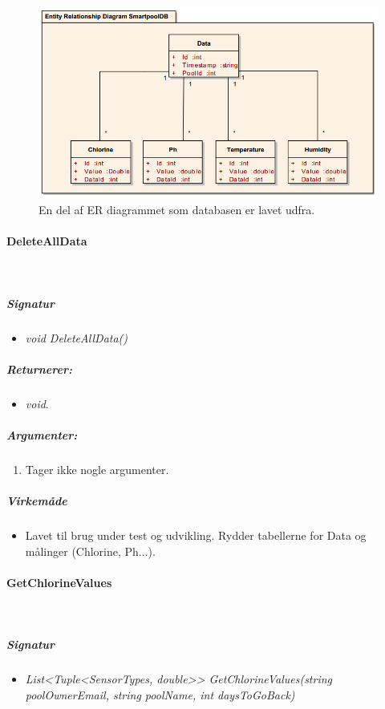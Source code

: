 \begin{figure}[h]
\centering
\includegraphics[width=0.8\linewidth]{figs/implementering/datasetentity.png}
\caption{En del af ER diagrammet som databasen er lavet udfra.}
\label{fig:datasetentity}
\end{figure}

\paragraph{DeleteAllData}\ %

\subparagraph{Signatur}
\begin{itemize}
	\item \textit{void DeleteAllData()}
\end{itemize}

\subparagraph{Returnerer:}
\begin{itemize}
	\item \textit{void}.
\end{itemize}

\subparagraph{Argumenter:}
\begin{enumerate}
	\item Tager ikke nogle argumenter.
\end{enumerate}

\subparagraph{Virkemåde}
\begin{itemize}
	\item Lavet til brug under test og udvikling. Rydder tabellerne for Data og målinger (Chlorine, Ph...).
\end{itemize}


\paragraph{GetChlorineValues}\ %


\subparagraph{Signatur}
\begin{itemize}
	\item \textit{List<Tuple<SensorTypes, double>> GetChlorineValues(string poolOwnerEmail, string poolName, int daysToGoBack)}
\end{itemize}

